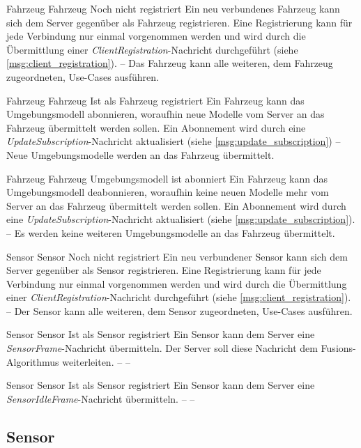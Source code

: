 	{Fahrzeug}
	{Fahrzeug}
	{Noch nicht registriert}
	{Ein neu verbundenes Fahrzeug kann sich dem Server gegenüber als Fahrzeug registrieren.
		Eine Registrierung kann für jede Verbindung  nur einmal vorgenommen werden und wird durch die Übermittlung einer \textit{ClientRegistration}-Nachricht durchgeführt (siehe \autoref{msg:client_registration}).}
	{--}
	{Das Fahrzeug kann alle weiteren, dem Fahrzeug zugeordneten, Use-Cases ausführen.}

	{Fahrzeug}
	{Fahrzeug}
	{Ist als Fahrzeug registriert}
	{Ein Fahrzeug kann das Umgebungsmodell abonnieren, woraufhin neue Modelle vom Server an das Fahrzeug übermittelt werden sollen.
		Ein Abonnement wird durch eine \textit{UpdateSubscription}-Nachricht aktualisiert (siehe \autoref{msg:update_subscription})}
	{--}
	{Neue Umgebungsmodelle werden an das Fahrzeug übermittelt.}
	
	
	{Fahrzeug}
	{Fahrzeug}
	{Umgebungsmodell ist abonniert}
	{Ein Fahrzeug kann das Umgebungsmodell deabonnieren, woraufhin keine neuen Modelle mehr vom Server an das Fahrzeug übermittelt werden sollen.
		Ein Abonnement wird durch eine \textit{UpdateSubscription}-Nachricht aktualisiert (siehe \autoref{msg:update_subscription}).}
	{--}
	{Es werden keine weiteren Umgebungsmodelle an das Fahrzeug übermittelt.}

	{Sensor}
	{Sensor}
	{Noch nicht registriert}
	{Ein neu verbundener Sensor kann sich dem Server gegenüber als Sensor registrieren.
		Eine Registrierung kann für jede Verbindung nur einmal vorgenommen werden und wird durch die Übermittlung einer \textit{ClientRegistration}-Nachricht durchgeführt (siehe \autoref{msg:client_registration}).}
	{--}
	{Der Sensor kann alle weiteren, dem Sensor zugeordneten, Use-Cases ausführen.}

	{Sensor}
	{Sensor}
	{Ist als Sensor registriert}
	{Ein Sensor kann dem Server eine \textit{SensorFrame}-Nachricht übermitteln.
		Der Server soll diese Nachricht dem Fusions-Algorithmus weiterleiten.}
	{--}
	{--}

	{Sensor}
	{Sensor}
	{Ist als Sensor registriert}
	{Ein Sensor kann dem Server eine \textit{SensorIdleFrame}-Nachricht übermitteln.}
	{--}
	{--}
	
\subsection{Sensor}


